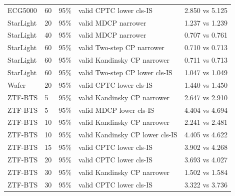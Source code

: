 \begin{longtable}{lllll}
ECG5000 & 60 & 95\% & valid CPTC lower cls-IS & 2.850 vs 5.125 \\
StarLight & 20 & 95\% & valid MDCP narrower & 1.237 vs 1.239 \\
StarLight & 40 & 95\% & valid MDCP narrower & 0.707 vs 0.761 \\
StarLight & 60 & 95\% & valid Two-step CP narrower & 0.710 vs 0.713 \\
StarLight & 60 & 95\% & valid Kandinsky CP narrower & 0.711 vs 0.713 \\
StarLight & 60 & 95\% & valid Two-step CP lower cls-IS & 1.047 vs 1.049 \\
Wafer & 20 & 95\% & valid CPTC lower cls-IS & 1.440 vs 1.450 \\
ZTF-BTS & 5 & 95\% & valid Kandinsky CP narrower & 2.647 vs 2.910 \\
ZTF-BTS & 5 & 95\% & valid MDCP lower cls-IS & 4.404 vs 4.694 \\
ZTF-BTS & 10 & 95\% & valid Kandinsky CP narrower & 2.241 vs 2.481 \\
ZTF-BTS & 10 & 95\% & valid Kandinsky CP lower cls-IS & 4.405 vs 4.622 \\
ZTF-BTS & 15 & 95\% & valid CPTC lower cls-IS & 3.902 vs 4.268 \\
ZTF-BTS & 20 & 95\% & valid CPTC lower cls-IS & 3.693 vs 4.027 \\
ZTF-BTS & 30 & 95\% & valid Kandinsky CP narrower & 1.502 vs 1.584 \\
ZTF-BTS & 30 & 95\% & valid CPTC lower cls-IS & 3.322 vs 3.736 \\
\bottomrule
\end{longtable}
\par\endgroup
